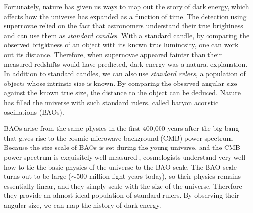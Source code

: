 \documentclass[letterpaper,11pt,preprint]{aastex}
\begin{document}
Fortunately, nature has given us ways to map out the story of dark
energy, which affects how the universe has expanded as a
function of time.  The detection using supernovae relied on
the fact that astronomers understand their true brightness and
can use them as {\textit{standard candles}}.  With a standard candle,
by comparing the observed brightness of an object with its known true
luminosity, one can work out its distance.  Therefore, when supernovae
appeared fainter than their measured redshifts would have predicted,
dark energy was a natural explanation.  In addition to standard
candles, we can also use {\textit{standard rulers}}, a population of
objects whose intrinsic size is known.  By comparing the observed
angular size against the known true size, the distance to the object can
be deduced.  Nature has filled the universe with such standard
rulers, called baryon acoustic oscillations (BAOs).  


BAOs arise from the same physics in the first 400,000 years after the
big bang that gives rise to the cosmic microwave background (CMB)
power spectrum.  Because the size scale of BAOs is set during the
young universe, and the CMB power spectrum is exquisitely well
measured \citep{PlanckSpectra2015,Louis2017,Henning2018}, cosmologists
understand very well how to tie the basic physics of the universe to
the BAO scale.  The BAO scale turns out to be large ($\sim$500 million
light years today), so their physics remains essentially linear, and
they simply scale with the size of the universe.  Therefore they
provide an almost ideal population of standard rulers. By observing
their angular size, we can map the history of dark energy.
\end{document}
